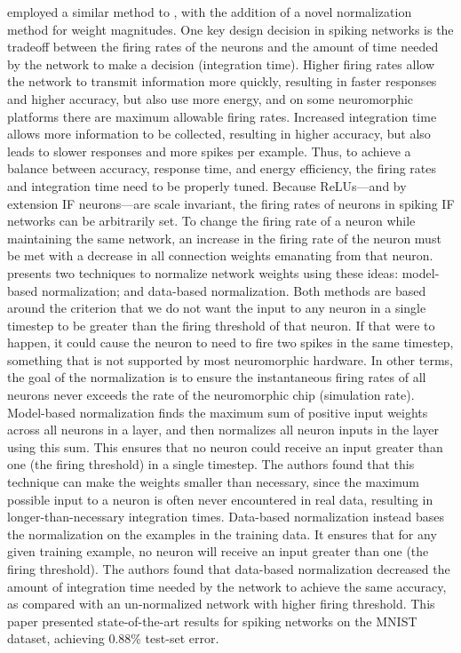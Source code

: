 \textcite{Diehl2015} employed a similar method to \textcite{Cao2014},
with the addition of a novel normalization method for weight magnitudes.
One key design decision in spiking networks is the tradeoff between
the firing rates of the neurons
and the amount of time needed by the network to make a decision (integration time).
Higher firing rates allow the network to transmit information more quickly,
resulting in faster responses and higher accuracy,
but also use more energy,
and on some neuromorphic platforms there are maximum allowable firing rates.
Increased integration time allows more information to be collected,
resulting in higher accuracy,
but also leads to slower responses and more spikes per example.
Thus, to achieve a balance between
accuracy, response time, and energy efficiency,
the firing rates and integration time need to be properly tuned.
Because ReLUs---and by extension IF neurons---are scale invariant,
the firing rates of neurons in spiking IF networks can be arbitrarily set.
To change the firing rate of a neuron while maintaining the same network,
an increase in the firing rate of the neuron must be met with
a decrease in all connection weights emanating from that neuron.
\textcite{Diehl2015} presents two techniques to normalize network weights
using these ideas: model-based normalization; and data-based normalization.
Both methods are based around the criterion that we do not want
the input to any neuron in a single timestep to be greater than
the firing threshold of that neuron.
If that were to happen,
it could cause the neuron to need to fire two spikes in the same timestep,
something that is not supported by most neuromorphic hardware.
In other terms,
the goal of the normalization is to ensure the instantaneous firing rates
of all neurons never exceeds the rate of the neuromorphic chip (simulation rate).
Model-based normalization finds the maximum sum of positive input weights
across all neurons in a layer,
and then normalizes all neuron inputs in the layer using this sum.
This ensures that no neuron could receive an input greater than
one (the firing threshold) in a single timestep.
The authors found that this technique can make the weights smaller than necessary,
since the maximum possible input to a neuron is often never encountered in real data,
resulting in longer-than-necessary integration times.
Data-based normalization instead bases the normalization
on the examples in the training data.
It ensures that for any given training example,
no neuron will receive an input greater than one (the firing threshold).
The authors found that data-based normalization
decreased the amount of integration time needed by the network
to achieve the same accuracy,
as compared with an un-normalized network with higher firing threshold.
This paper presented state-of-the-art results for spiking networks
on the MNIST dataset, achieving 0.88\% test-set error.

